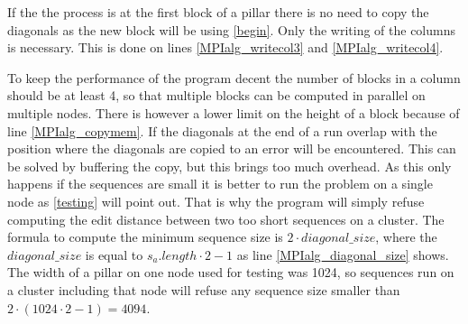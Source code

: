 If the the process is at the first block of a pillar there is no need to copy the diagonals as the new block will be using \cref{begin}.
Only the writing of the columns is necessary.
This is done on lines \ref{MPIalg_writecol3} and \ref{MPIalg_writecol4}.

To keep the performance of the program decent the number of blocks in a column should be at least 4, so that multiple blocks can be computed in parallel on multiple nodes.
There is however a lower limit on the height of a block because of line \ref{MPIalg_copymem}.
If the diagonals at the end of a run overlap with the position where the diagonals are copied to an error will be encountered.
This can be solved by buffering the copy, but this brings too much overhead.
As this only happens if the sequences are small it is better to run the problem on a single node as \cref{testing} will point out.
That is why the program will simply refuse computing the edit distance between two too short sequences on a cluster.
The formula to compute the minimum sequence size is $2 \cdot diagonal\_size$, where the $diagonal\_size$ is equal to $s_a.length \cdot 2 - 1$ as line \ref{MPIalg_diagonal_size} shows.
The width of a pillar on one node used for testing was 1024, so sequences run on a cluster including that node will refuse any sequence size smaller than $2 \cdot (1024 \cdot 2 - 1) = 4094$.
